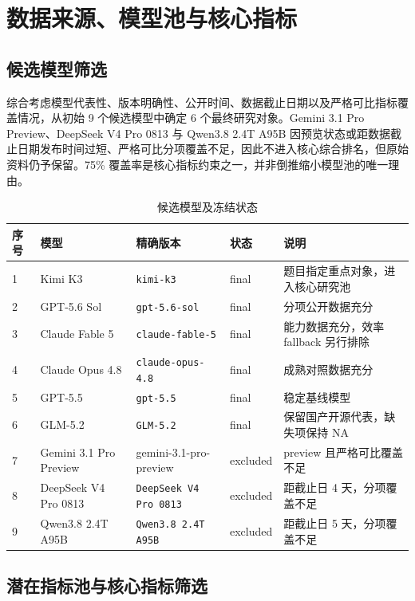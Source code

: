 \documentclass[UTF8,zihao=-4,a4paper,fontset=none]{ctexart}
\begin{document}
\section{数据来源、模型池与核心指标}

\subsection{候选模型筛选}

综合考虑模型代表性、版本明确性、公开时间、数据截止日期以及严格可比指标覆盖情况，从初始 9 个候选模型中确定 6 个最终研究对象。Gemini 3.1 Pro Preview、DeepSeek V4 Pro 0813 与 Qwen3.8 2.4T A95B 因预览状态或距数据截止日期发布时间过短、严格可比分项覆盖不足，因此不进入核心综合排名，但原始资料仍予保留。75\% 覆盖率是核心指标约束之一，并非倒推缩小模型池的唯一理由。

\begin{table}[H]
  \centering
  \caption{候选模型及冻结状态}
  \label{tab:candidates}
  \begin{tabularx}{\textwidth}{C{0.8cm}L{3.3cm}L{3.3cm}C{1.5cm}X}
    \toprule
    序号 & 模型 & 精确版本 & 状态 & 说明 \\
     & Kimi K3 & \texttt{kimi-k3} & final & 题目指定重点对象，进入核心研究池 \\
    2 & GPT-5.6 Sol & \texttt{gpt-5.6-sol} & final & 分项公开数据充分 \\
    3 & Claude Fable 5 & \texttt{claude-fable-5} & final & 能力数据充分，效率 fallback 另行排除 \\
    4 & Claude Opus 4.8 & \texttt{claude-opus-4.8} & final & 成熟对照数据充分 \\
    5 & GPT-5.5 & \texttt{gpt-5.5} & final & 稳定基线模型 \\
    6 & GLM-5.2 & \texttt{GLM-5.2} & final & 保留国产开源代表，缺失项保持 NA \\
    7 & Gemini 3.1 Pro Preview & gemini-3.1-pro-preview & excluded & preview 且严格可比覆盖不足 \\
    8 & DeepSeek V4 Pro 0813 & \texttt{DeepSeek V4 Pro 0813} & excluded & 距截止日 4 天，分项覆盖不足 \\
    9 & Qwen3.8 2.4T A95B & \texttt{Qwen3.8 2.4T A95B} & excluded & 距截止日 5 天，分项覆盖不足 \\
    \bottomrule
  \end{tabularx}
\end{table}

\subsection{潜在指标池与核心指标筛选}
\end{document}
